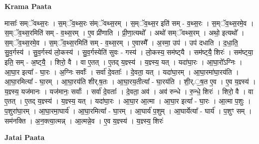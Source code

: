 \documentclass[17pt]{extarticle}
\begin{document}
\textbf{Krama Paata} \newline

मासाः᳚ सम्ॅवथ्स॒रः । स॒म्ॅव॒थ्स॒रः स॑म्ॅवथ्स॒रम् । स॒म्ॅव॒थ्स॒र इति॑ सम् - व॒थ्स॒रः । स॒म्ॅव॒थ्स॒रमे॒व । स॒म्ॅव॒थ्स॒रमिति॑ सम् - व॒थ्स॒रम् । ए॒व प्री॑णाति । प्री॒णा॒त्यथो᳚ । अथो॑ सम्ॅवथ्स॒रम् । अथो॒ इत्यथो᳚ । स॒म्ॅव॒थ्स॒रमे॒व । स॒म्ॅव॒थ्स॒रमिति॑ सम् - व॒थ्स॒रम् । ए॒वास्मै᳚ । अ॒स्मा॒ उप॑ । उप॑ दधाति । द॒धा॒ति॒ सु॒व॒र्गस्य॑ । सु॒व॒र्गस्य॑ लो॒कस्य॑ । सु॒व॒र्गस्येति॑ सुवः - गस्य॑ । लो॒कस्य॒ सम॑ष्ट्‍यै । सम॑ष्ट्‍यै॒ शिरः॑ । सम॑ष्ट्‍या॒ इति॒ सम् - अ॒ष्ट्‍यै॒ । शिरो॒ वै । वा ए॒तत् । ए॒तद् य॒ज्ञ्स्य॑ । य॒ज्ञ्स्य॒ यत् । यदा॑घा॒रः । आ॒घा॒रो᳚ऽग्निः । आ॒घा॒र इत्या᳚ - घा॒रः । अ॒ग्निः सर्वाः᳚ । सर्वा॑ दे॒वताः᳚ । दे॒वता॒ यत् । यदा॑घा॒रम् । आ॒घा॒रमा॑घा॒रय॑ति । आ॒घा॒रमित्या᳚ - घा॒रम् । आ॒घा॒रय॑ति शीर्.ष॒तः । आ॒घा॒रय॒तीत्या᳚ - घा॒रय॑ति । शी॒र्.॒ष॒त ए॒व । ए॒व य॒ज्ञ्स्य॑ । य॒ज्ञ्स्य॒ यज॑मानः । यज॑मानः॒ सर्वाः᳚ । सर्वा॑ दे॒वताः᳚ । दे॒वता॒ अव॑ । अव॑ रुन्धे । रु॒न्धे॒ शिरः॑ । शिरो॒ वै । वा ए॒तत् । ए॒तद् य॒ज्ञ्स्य॑ । य॒ज्ञ्स्य॒ यत् । यदा॑घा॒रः । आ॒घा॒र आ॒त्मा । आ॒घा॒र इत्या᳚ - घा॒रः । आ॒त्मा प॒शुः । प॒शुरा॑घा॒रम् । आ॒घा॒रमा॒घार्य॑ । आ॒घा॒रमित्या᳚ - घा॒रम् । आ॒घार्य॑ प॒शुम् । आ॒घार्येत्या᳚ - घार्य॑ । प॒शुꣳ सम् । सम॑नक्ति । अ॒न॒क्त्या॒त्मन्न् । आ॒त्मन्ने॒व । ए॒व य॒ज्ञ्स्य॑ । य॒ज्ञ्स्य॒ शिरः॑ \newline

\textbf{Jatai Paata} \newline
\end{document}
